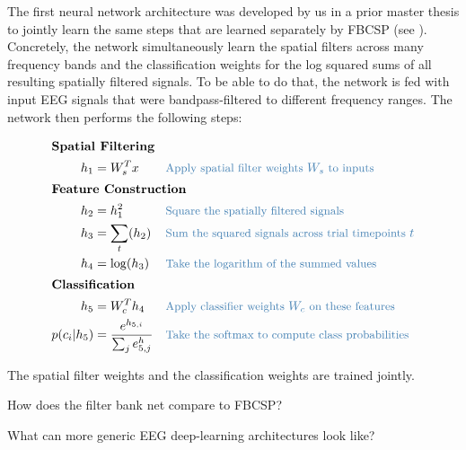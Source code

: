     The first neural network architecture was developed by us in a prior
master thesis \citep{schirrmeister_msc_thesis_2015} to
jointly learn the same steps that are learned separately by FBCSP (see
). Concretely, the network
simultaneously learn the spatial filters across many frequency bands and
the classification weights for the log squared sums of all resulting
spatially filtered signals. To be able to do that, the network is fed
with input EEG signals that were bandpass-filtered to different
frequency ranges. The network then performs the following steps:




\begin{align*}
    \intertext{\textbf{Spatial Filtering}}
    h_1 &= W_s^Tx && \codecomment{\text{Apply spatial filter weights } W_s \text{ to  inputs }} \\
    \intertext{\textbf{Feature Construction}}
    h_2 &= h_1^2 && \codecomment{\text{Square the spatially filtered signals }} \\
    h_3 &=\sum_t (h_2) && \codecomment{\text{Sum the squared signals across trial timepoints } t} \\
    h_4 &= \log(h_3) && \codecomment{\text{Take the logarithm of the summed values}}\\
    \intertext{\textbf{Classification}}
    h_5 &= W_c^Th_4 && \codecomment{\text{Apply classifier weights } W_c \text{ on these features }} \\
    p(c_i|h_5) &= \frac{e^{h_{5,i}}}{\sum_j e^h_{5,j}} && \codecomment{\text{Take the softmax to compute class probabilities}} \\
\end{align*}

    The spatial filter weights and the classification weights are trained
jointly.

\begin{openbox}
\item How does the filter bank net compare to FBCSP?
\item What can more generic EEG deep-learning architectures look like?
\end{openbox}


